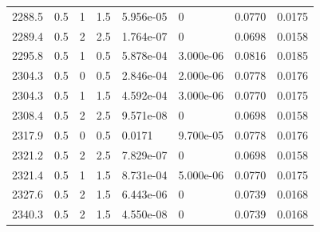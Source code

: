 \documentclass[preview]{standalone}
\begin{document}
{{{{{\begin{tabular}{L{1.2cm}C{1.2cm} C{0.3cm}C{0.5cm} C{1.4cm}C{1.4cm} C{1.4cm}C{1.4cm}}
  2288.5  &   0.5  & 1     & 1.5 &  5.956e-05  & 0  & 0.0770 &  0.0175   \\ 
  2289.4  &   0.5  & 2     & 2.5 &  1.764e-07  & 0  & 0.0698 &  0.0158   \\ 
  2295.8  &   0.5  & 1     & 0.5 &  5.878e-04  & 3.000e-06  & 0.0816 &  0.0185   \\ 
  2304.3  &   0.5  & 0     & 0.5 &  2.846e-04  & 2.000e-06  & 0.0778 &  0.0176   \\ 
  2304.3  &   0.5  & 1     & 1.5 &  4.592e-04  & 3.000e-06  & 0.0770 &  0.0175   \\ 
  2308.4  &   0.5  & 2     & 2.5 &  9.571e-08  & 0  & 0.0698 &  0.0158   \\ 
  2317.9  &   0.5  & 0     & 0.5 &  0.0171  & 9.700e-05  & 0.0778 &  0.0176   \\ 
  2321.2  &   0.5  & 2     & 2.5 &  7.829e-07  & 0  & 0.0698 &  0.0158   \\ 
  2321.4  &   0.5  & 1     & 1.5 &  8.731e-04  & 5.000e-06  & 0.0770 &  0.0175   \\ 
  2327.6  &   0.5  & 2     & 1.5 &  6.443e-06  & 0  & 0.0739 &  0.0168   \\ 
  2340.3  &   0.5  & 2     & 1.5 &  4.550e-08  & 0  & 0.0739 &  0.0168   \\ 
\hline 
\end{tabular} 

}}}}}
\end{document}

